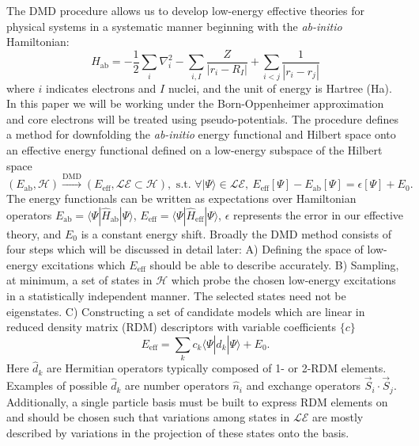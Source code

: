 \documentclass{article}
\begin{document}
The DMD procedure allows us to develop low-energy effective theories for physical systems in a systematic manner beginning with the \textit{ab-initio} Hamiltonian:
\begin{equation}
\hat{H}_\text{ab} = -\frac{1}{2} \sum_{i} \nabla_i^2 - \sum_{i,I}\frac{Z}{|r_i - R_I|} + \sum_{i<j}\frac{1}{|r_i - r_j|}
\label{eq:Hab}
\end{equation}
where $i$ indicates electrons and $I$ nuclei, and the unit of energy is Hartree (Ha).
In this paper we will be working under the Born-Oppenheimer approximation and core electrons will be treated using pseudo-potentials.
The procedure defines a method for downfolding the \textit{ab-initio} energy functional and Hilbert space onto an effective energy functional defined on a low-energy subspace of the Hilbert space 
\begin{equation}
(E_\text{ab}, \mathcal{H}) \xrightarrow{\text{DMD}} (E_\text{eff}, \mathcal{LE} \subset \mathcal{H}), \text{ s.t. }
\forall |\Psi\rangle \in \mathcal{LE}, \ E_\text{eff}[\Psi] - E_\text{ab}[\Psi] = \epsilon[\Psi] + E_0.
\label{eq:DMD}
\end{equation} 
The energy functionals can be written as expectations over Hamiltonian operators $E_\text{ab} = \langle \Psi | \hat{H}_\text{ab} |\Psi \rangle$, $E_\text{eff} = \langle \Psi | \hat{H}_\text{eff} |\Psi \rangle$, $\epsilon$ represents the error in our effective theory, and $E_0$ is a constant energy shift.
Broadly the DMD method consists of four steps which will be discussed in detail later: 
A) Defining the space of low-energy excitations which $E_\text{eff}$ should be able to describe accurately.
B) Sampling, at minimum, a set of states in $\mathcal{H}$ which probe the chosen low-energy excitations in a statistically independent manner. The selected states need not be eigenstates. 
C) Constructing a set of candidate models which are linear in reduced density matrix (RDM) descriptors with variable coefficients $\{c\}$
\begin{equation}
E_\text{eff} = \sum_k c_k \langle \Psi | \hat{d}_k |\Psi \rangle + E_0.
\label{eq:Eeff}
\end{equation}
Here $\hat{d}_k$ are Hermitian operators typically composed of 1- or 2-RDM elements. 
Examples of possible $\hat{d}_k$ are number operators $\hat{n}_i$ and exchange operators $\vec{S}_i \cdot \vec{S}_j$.
Additionally, a single particle basis must be built to express RDM elements on and should be chosen such that variations among states in $\mathcal{LE}$ are mostly described by variations in the projection of these states onto the basis.
\end{document}
